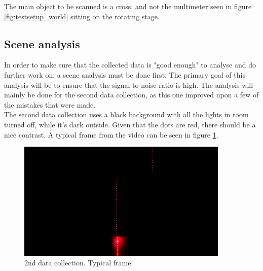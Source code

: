 The main object to be scanned is a cross, and not the multimeter seen in figure \ref{fig:testsetup_world} sitting on the rotating stage. 

\subsection{Scene analysis}
In order to make sure that the collected data is "good enough" to analyse and do further work on, a scene analysis must be done first. The primary goal of this analysis will be to ensure that the signal to noise ratio is high. The analysis will mainly be done for the second data collection, as this one improved upon a few of the mistakes that were made. \\

The second data collection uses a black background with all the lights in room turned off, while it's dark outside. Given that the dots are red, there should be a nice contrast. A typical frame from the video can be seen in figure \ref{fig:cross2basic}.
\FloatBarrier
\begin{figure}[h]
        \centering
        \includegraphics[width=0.9\textwidth]{figures/ImageAnalysis/cross2_base.png}
        \caption{2nd data collection. Typical frame.}
        \label{fig:cross2basic}
\end{figure}

